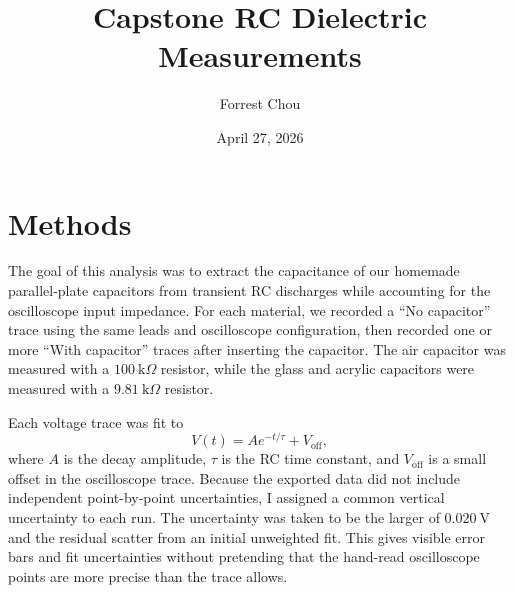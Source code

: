\documentclass[letterpaper,12pt]{article}
\title{\Huge Capstone RC Dielectric Measurements}
\author{\large Forrest Chou}
\date{April 27, 2026}
\begin{document}
\maketitle

\section*{Methods}

The goal of this analysis was to extract the capacitance of our homemade parallel-plate capacitors from transient RC discharges while accounting for the oscilloscope input impedance. For each material, we recorded a ``No capacitor'' trace using the same leads and oscilloscope configuration, then recorded one or more ``With capacitor'' traces after inserting the capacitor. The air capacitor was measured with a $100~\mathrm{k}\Omega$ resistor, while the glass and acrylic capacitors were measured with a $9.81~\mathrm{k}\Omega$ resistor.

Each voltage trace was fit to
\begin{equation}
    V(t) = A e^{-t/\tau} + V_{\mathrm{off}},
\end{equation}
where $A$ is the decay amplitude, $\tau$ is the RC time constant, and $V_{\mathrm{off}}$ is a small offset in the oscilloscope trace. Because the exported data did not include independent point-by-point uncertainties, I assigned a common vertical uncertainty to each run. The uncertainty was taken to be the larger of $0.020~\mathrm{V}$ and the residual scatter from an initial unweighted fit. This gives visible error bars and fit uncertainties without pretending that the hand-read oscilloscope points are more precise than the trace allows.
\end{document}

